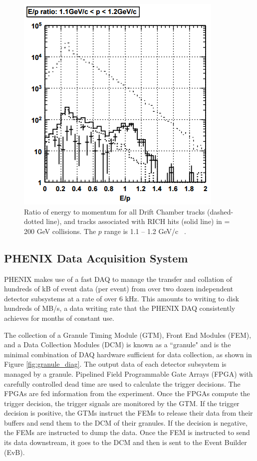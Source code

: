 \begin{figure}[!ht]
\centering
\includegraphics[width=0.55\linewidth]{figs/e_over_p_rich_discrimination.png}
\caption{Ratio of energy to momentum for all Drift Chamber tracks (dashed-dotted line), and tracks associated with RICH hits (solid line) in \auau \sqsn = 200 GeV collisions. The $p$ range is 1.1 -- 1.2 GeV/c ~\cite{Aizawa2003508}.}
\label{fig:rich_discrim_ep}
\end{figure}

\subsection{PHENIX Data Acquisition System}
\label{sec:PHENIX_DAQ}
PHENIX makes use of a fast DAQ to manage the transfer and collation of hundreds of kB of event data (per event) from over two dozen independent detector subsystems at a rate of over 6 kHz. This amounts to writing to disk hundreds of MB/s, a data writing rate that the PHENIX DAQ consistently achieves for months of constant use. 

The collection of a  Granule Timing Module (GTM), Front End Modules (FEM), and a Data Collection Modules (DCM) is known as a ``granule" and is the minimal combination of DAQ hardware sufficient for data collection, as shown in Figure \ref{fig:granule_diag}. The output data of each detector subsystem is managed by a granule. Pipelined Field Programmable Gate Arrays (FPGA) with carefully controlled dead time are used to calculate the trigger decisions. The FPGAs are fed information from the experiment. Once the FPGAs compute the trigger decision, the trigger signals are monitored by the GTM. If the trigger decision is positive, the GTMs instruct the FEMs to release their data from their buffers and send them to the DCM of their granules. If the decision is negative, the FEMs are instructed to dump the data.  Once the FEM is instructed to send its data downstream, it goes to the DCM and then is sent to the Event Builder (EvB).

